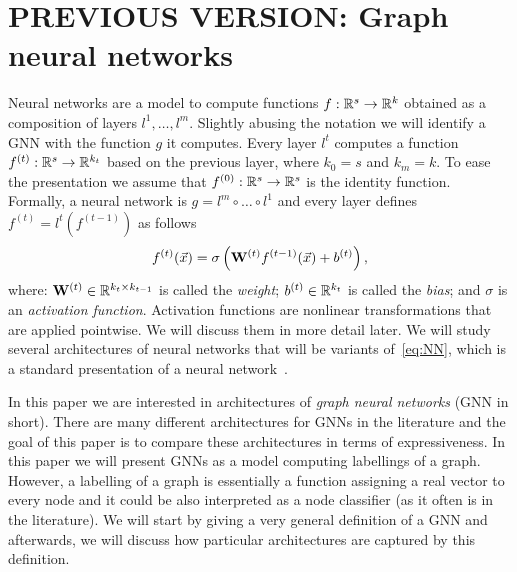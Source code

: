 \section{PREVIOUS VERSION: Graph neural networks}
Neural networks are a model to compute functions $f : \mathbb{R}^s \to \mathbb{R}^k$ obtained as a composition of layers $l^1,\ldots, l^m$.  Slightly abusing the notation we will identify a GNN with the function $g$ it computes. Every layer $l^t$ computes a function $f^{(t)} : \mathbb{R}^{s} \to \mathbb{R}^{k_t}$ based on the previous layer, where $k_0 = s$ and $k_m =k$. To ease the presentation we assume that $f^{(0)} : \mathbb{R}^s \to \mathbb{R}^s$ is the identity function. Formally, a neural network is $g = l^m \circ \ldots \circ l^1 $ and every layer defines $f^{(t)} = l^t(f^{(t-1)})$ as follows
\begin{equation}\label{eq:NN}
 f^{(t)} (\vec{x}) = \sigma \left(\mathbf{W}^{(t)} f^{(t-1)}(\vec{x}) + b^{(t)}  \right),
\end{equation}
where: $\mathbf{W}^{(t)} \in \mathbb{R}^{k_{t} \times k_{t-1}}$ is called the \emph{weight}; $b^{(t)} \in \mathbb{R}^{k_t}$ is called the \emph{bias}; and $\sigma$ is an \emph{activation function}. Activation functions are nonlinear transformations that are applied pointwise. We will discuss them in more detail later. We will study several architectures of neural networks that will be variants of~\eqref{eq:NN}, which is a standard presentation of a neural network~\cite{?}.

In this paper we are interested in architectures of \emph{graph neural networks} (GNN in short). 
There are many different architectures for GNNs in the literature and the goal of this paper is to compare these architectures in terms of expressiveness. In this paper we will present GNNs as a model computing labellings of a graph. However, a labelling of a graph is essentially a function assigning a real vector to every node and it could be also interpreted as a node classifier (as it often is in the literature). We will start by giving a very general definition of a GNN and afterwards, we will discuss how particular architectures are captured by this definition.

